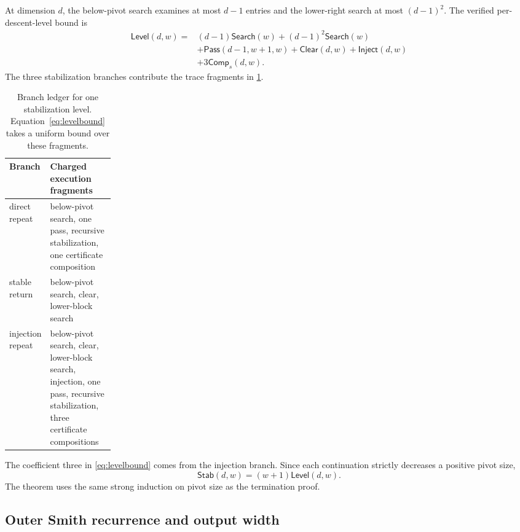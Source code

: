 \documentclass[11pt]{article}
\theoremstyle{definition}
\begin{document}
At dimension $d$, the below-pivot search examines at most $d-1$ entries and the lower-right search at most $(d-1)^2$.  The verified per-descent-level bound is
\begin{equation}
\begin{split}
 \mathsf{Level}(d,w)={}&
  (d-1)\mathsf{Search}(w)
  +(d-1)^2\mathsf{Search}(w)\\
 &+\mathsf{Pass}(d-1,w+1,w)
  +\mathsf{Clear}(d,w)+\mathsf{Inject}(d,w)\\
 &+3\mathsf{Comp}_s(d,w).
\end{split}
\label{eq:levelbound}
\end{equation}
The three stabilization branches contribute the trace fragments in \cref{tab:stabledger}.
\begin{table}[H]
\centering
\footnotesize
\begin{tabularx}{\linewidth}{@{}p{0.20\linewidth}X@{}}
\toprule
Branch & Charged execution fragments \\
\midrule
direct repeat & below-pivot search, one pass, recursive stabilization, one certificate composition \\
stable return & below-pivot search, clear, lower-block search \\
injection repeat & below-pivot search, clear, lower-block search, injection, one pass, recursive stabilization, three certificate compositions \\
\bottomrule
\end{tabularx}
\caption{Branch ledger for one stabilization level.  Equation~\eqref{eq:levelbound} takes a uniform bound over these fragments.}
\label{tab:stabledger}
\end{table}
The coefficient three in \eqref{eq:levelbound} comes from the injection branch.  Since each continuation strictly decreases a positive pivot size,
\begin{equation}
  \mathsf{Stab}(d,w)=(w+1)\mathsf{Level}(d,w).
  \label{eq:stabbound}
\end{equation}
The theorem uses the same strong induction on pivot size as the termination proof.

\subsection{Outer Smith recurrence and output width}
\end{document}
